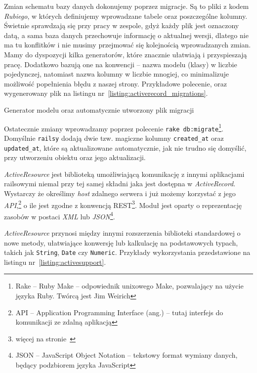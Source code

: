 \documentclass[a4paper,12pt]{article}
\begin{document}
Zmian schematu bazy danych dokonujemy poprzez migracje. Są to pliki z kodem \emph{Rubiego},
w których definiujemy wprowadzane tabele oraz poszczególne kolumny. Świetnie sprawdzają
się przy pracy w zespole, gdyż każdy plik jest oznaczony datą, a sama baza danych
przechowuje informację o aktualnej wersji, dlatego nie ma tu konflitków i nie musimy
przejmować się kolejnością wprowadzanych zmian. Mamy do dyspozycji kilka generatorów,
które znacznie ułatwiają i przyspieszają pracę. Dodatkowo bazują one na konwencji -- nazwa
modelu (klasy) w liczbie pojedynczej, natomiast nazwa kolumny w liczbie mnogiej, co
minimalizuje możliwość popełnienia błędu z naszej strony. Przykładowe polecenie, oraz
wygenerowany plik na listingu nr~\ref{listing:activerecord_migrations}.

\begin{listing}
  
  \caption{Generator modelu oraz automatycznie utworzony plik migracji}
  \label{listing:activerecord_migrations}
\end{listing}


Ostatecznie zmiany wprowadzamy poprzez polecenie \texttt{rake db:migrate}\footnote{Rake --
Ruby Make -- odpowiednik unixowego Make, pozwalający na użycie języka Ruby. Twórcą
jest Jim Weirich}. Domyślnie \texttt{railsy} dodają dwie tzw. magiczne kolumny
\texttt{created\_at} oraz \texttt{updated\_at}, które są aktualizowane automatycznie, jak
nie trudno się domyślić, przy utworzeniu obiektu oraz jego aktualizacji.


\emph{ActiveResource} jest biblioteką umożliwiającą komunikację z innymi
aplikacjami railsowymi niemal przy tej samej składni jaka jest dostępna w \emph
{ActiveRecord}. Wystarczy że określimy \emph{host} zdalnego serwera i już
możemy korzystać z jego \emph{API},\footnote{API -- Application Programming
Interface (ang.) -- tutaj interfejs do komunikacji ze zdalną aplikacją} o ile
jest zgodne z konwencją REST\footnote{więcej na stronie~\pageref{sec:rest}}.
Moduł jest oparty o reprezentację zasobów w postaci \emph{XML} lub
\emph{JSON}\footnote{JSON -- JavaScript Object Notation -- tekstowy format wymiany
danych, będący podzbiorem języka JavaScript}.


\emph{ActiveResource} przynosi między innymi rozszerzenia biblioteki
standardowej o nowe metody, ułatwiające konwersję lub kalkulację na podstawowych
typach, takich jak \texttt{String}, \texttt{Date} czy \texttt{Numeric}. Przykłady
wykorzystania przedstawione na listingu nr~\ref{listing:activesupport}.
\end{document}
